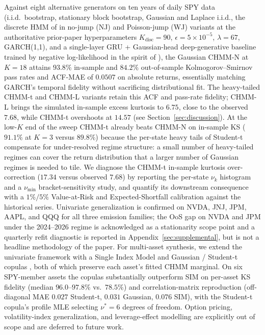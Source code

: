 Against eight alternative generators on ten years of daily SPY data (i.i.d.\ bootstrap, stationary block bootstrap, Gaussian and Laplace i.i.d., the discrete HMM of \citet{alswaidan2026hybrid} in no-jump (NJ) and Poisson-jump (WJ) variants at the authoritative prior-paper hyperparameters $K_{\text{disc}} = 90$, $\epsilon = 5 \times 10^{-5}$, $\lambda = 67$, GARCH(1,1), and a single-layer GRU + Gaussian-head deep-generative baseline trained by negative log-likelihood in the spirit of \citet{yoon2019timegan}), the Gaussian CHMM-N at $K = 18$ attains $93.8\%$ in-sample and $84.2\%$ out-of-sample Kolmogorov--Smirnov pass rates and ACF-MAE of $0.0507$ on absolute returns, essentially matching GARCH's temporal fidelity without sacrificing distributional fit.
The heavy-tailed CHMM-t and CHMM-L variants retain this ACF and pass-rate fidelity; CHMM-L brings the simulated in-sample excess kurtosis to $6.75$, close to the observed $7.68$, while CHMM-t overshoots at $14.57$ (see Section~\ref{sec:discussion}).
At the low-$K$ end of the sweep CHMM-t already beats CHMM-N on in-sample KS ($91.1\%$ at $K = 3$ versus $89.8\%$) because the per-state heavy tails of Student-t compensate for under-resolved regime structure: a small number of heavy-tailed regimes can cover the return distribution that a larger number of Gaussian regimes is needed to tile.
We diagnose the CHMM-t in-sample kurtosis over-correction ($17.34$ versus observed $7.68$) by reporting the per-state $\nu_k$ histogram and a $\nu_{\min}$ bracket-sensitivity study, and quantify its downstream consequence with a $1\%/5\%$ Value-at-Risk and Expected-Shortfall calibration against the historical series.
Univariate generalization is confirmed on NVDA, JNJ, JPM, AAPL, and QQQ for all three emission families; the OoS gap on NVDA and JPM under the 2024--2026 regime is acknowledged as a stationarity scope point and a quarterly refit diagnostic is reported in Appendix~\ref{sec:supplemental}, but is not a headline methodology of the paper.
For multi-asset synthesis, we extend the univariate framework with a Single Index Model \cite{sharpe1963simplified} and Gaussian / Student-t copulas \cite{sklar1959fonctions, demarta2005tcopula, mcneil2015quantitative}, both of which preserve each asset's fitted CHMM marginal.
On six SPY-member assets the copulas substantially outperform SIM on per-asset KS fidelity (median $96.0$--$97.8\%$ vs.\ $78.5\%$) and correlation-matrix reproduction (off-diagonal MAE $0.027$ Student-t, $0.031$ Gaussian, $0.076$ SIM), with the Student-t copula's profile MLE selecting $\nu^{*} = 6$ degrees of freedom.
Option pricing, volatility-index generalization, and leverage-effect modelling are explicitly out of scope and are deferred to future work.

